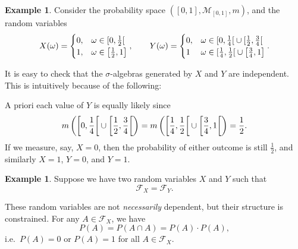 \documentclass[a4paper,12pt]{scrreprt}
\theoremstyle{definition}
\newtheorem{example}[definition]{Example}
\theoremstyle{plain}
\theoremstyle{remark}
\begin{document}
\begin{example}
  \label{eg:independentstepfunctions}
  Consider the probability space $\left( [0, 1], \mathcal{M}_{[0, 1]}, m \right)$, and the random variables
  \begin{equation*}
    X(\omega) =
    \begin{cases}
      0, &\omega \in \interval[open right]{0}{\frac{1}{2}} \\
      1, &\omega \in \left[ \frac{1}{2}, 1 \right]
    \end{cases},
    \qquad
    Y(\omega) =
    \begin{cases}
      0, & \omega \in \interval[open right]{0}{\frac{1}{4}} \cup \interval[open right]{\frac{1}{2}}{\frac{3}{4}} \\
      1 & \omega \in \interval[open right]{\frac{1}{4}}{\frac{1}{2}} \cup \left[ \frac{3}{4}, 1 \right]
    \end{cases}.
  \end{equation*}

  It is easy to check that the $\sigma$-algebras generated by $X$ and $Y$ are independent. This is intuitively because of the following:

  A priori each value of $Y$ is equally likely since
  \begin{equation*}
    m\left( \interval[open right, scaled]{0}{\frac{1}{4}} \cup \interval[open right, scaled]{\frac{1}{2}}{\frac{3}{4}} \right) = m\left( \interval[open right, scaled]{\frac{1}{4}}{\frac{1}{2}} \cup \interval[open right, scaled]{\frac{3}{4}}{1} \right) = \frac{1}{2}.
  \end{equation*}
  If we measure, say, $X = 0$, then the probability of either outcome is still $\frac{1}{2}$, and similarly $X = 1$, $Y = 0$, and $Y = 1$.
\end{example}

\begin{example}
  Suppose we have two random variables $X$ and $Y$ such that
  \begin{equation*}
    \mathcal{F}_{X} = \mathcal{F}_{Y}.
  \end{equation*}

  These random variables are not \emph{necessarily} dependent, but their structure is constrained. For any $A \in \mathcal{F}_{X}$, we have
  \begin{equation*}
    P(A) = P(A \cap A) = P(A)\cdot P(A),
  \end{equation*}
  i.e.\ $P(A) = 0$ or $P(A) = 1$ for all $A \in \mathcal{F}_{X}$.
\end{example}
\end{document}

